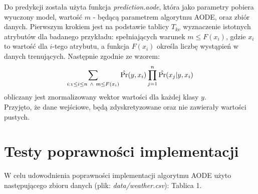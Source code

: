 \documentclass[16]{article}
\begin{document}
Do predykcji została użyta funkcja \textit{prediction.aode}, która jako parametry pobiera wyuczony model, wartość $m$ - będącą parametrem algorytmu AODE, oraz zbiór danych. Pierwszym krokiem jest na podstawie tablicy $T_{kv}$ wyznaczenie istotnych atrybutów dla badanego przykładu: spełniających warunek $m \leq F(x_{i})$, gdzie $x_{i}$ to wartość dla $i$-tego atrybutu, a funkcja $F(x_{i})$ określa liczbę wystąpień w danych trenujących. Następnie zgodnie ze wzorem:
\begin{equation}
 \label{AOENWzor}
 \sum_{\mathnormal{i:1 \leq i \leq n \ \wedge \ m \leq F(x_{i})} } \hat{\Pr}(\mathnormal{y, x_{i}})\prod_{j=1}^{n} \hat{\Pr}(\mathnormal{x_{j}|y, x_{i}})
\end{equation}
obliczany jest znormalizowany wektor wartości dla każdej klasy $y$. \\

Przyjęto, że dane wejściowe, będą zdyskretyzowane oraz nie zawierały wartości pustych.

\section{Testy poprawności implementacji}
W celu udowodnienia poprawności implementacji algorytmu AODE użyto następującego zbioru danych (plik: \textit{data/weather.csv}): Tablica 1.\\
\end{document}
